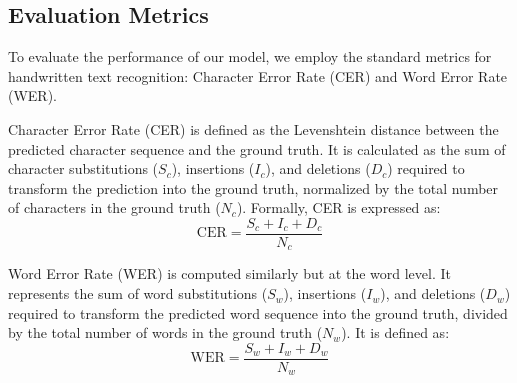 \documentclass[final,5p,times]{elsarticle}
\begin{document}
\subsection{Evaluation Metrics}
To evaluate the performance of our model, we employ the standard metrics for handwritten text recognition: Character Error Rate (CER) and Word Error Rate (WER).

Character Error Rate (CER) is defined as the Levenshtein distance between the predicted character sequence and the ground truth. It is calculated as the sum of character substitutions ($S_c$), insertions ($I_c$), and deletions ($D_c$) required to transform the prediction into the ground truth, normalized by the total number of characters in the ground truth ($N_c$). Formally, CER is expressed as:
\begin{equation}
    \text{CER} = \frac{S_c + I_c + D_c}{N_c}
\end{equation}

Word Error Rate (WER) is computed similarly but at the word level. It represents the sum of word substitutions ($S_w$), insertions ($I_w$), and deletions ($D_w$) required to transform the predicted word sequence into the ground truth, divided by the total number of words in the ground truth ($N_w$). It is defined as:
\begin{equation}
    \text{WER} = \frac{S_w + I_w + D_w}{N_w}
\end{equation}
\end{document}

